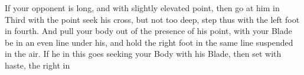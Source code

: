 \exercise{}
If your opponent is long, and with slightly elevated point, then go at
him in Third with the point seek his cross, but not too deep, step
thus with the left foot in fourth. And pull your body out of the
presence of his point, with your Blade be in an even line under his,
and hold the right foot in the same line suspended in the air. If he
in this goes seeking your Body with his Blade, then set with haste,
the right in
